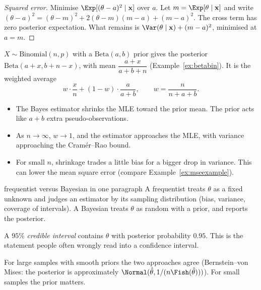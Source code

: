\begin{proof}[Squared error]
Minimise $\Exp[(\theta-a)^2\mid\mathbf{x}]$ over $a$. Let $m=\Exp[\theta\mid\mathbf{x}]$ and write $(\theta-a)^2=(\theta-m)^2+2(\theta-m)(m-a)+(m-a)^2$. The cross term has zero posterior expectation. What remains is $\Var(\theta\mid\mathbf{x})+(m-a)^2$, minimised at $a=m$.
\end{proof}

\begin{example}
$X\sim\mathrm{Binomial}(n,p)$ with a $\mathrm{Beta}(a,b)$ prior gives the posterior $\mathrm{Beta}(a+x,b+n-x)$, with mean $\dfrac{a+x}{a+b+n}$ (Example~\ref{ex:betabin}). It is the weighted average
\[ w\cdot\frac xn+(1-w)\cdot\frac a{a+b},\qquad w=\frac n{n+a+b}. \]
\begin{itemize}
  \item The Bayes estimator shrinks the MLE toward the prior mean. The prior acts like $a+b$ extra pseudo-observations.
  \item As $n\to\infty$, $w\to1$, and the estimator approaches the MLE, with variance approaching the Cram\'er--Rao bound.
  \item For small $n$, shrinkage trades a little bias for a bigger drop in variance. This can lower the mean square error (compare Example~\ref{ex:mseexample}).
\end{itemize}
\end{example}

\begin{interview}{frequentist versus Bayesian in one paragraph}
A frequentist treats $\theta$ as a fixed unknown and judges an estimator by its sampling distribution (bias, variance, coverage of intervals). A Bayesian treats $\theta$ as random with a prior, and reports the posterior.

A $95\%$ \emph{credible interval} contains $\theta$ with posterior probability $0.95$. This is the statement people often wrongly read into a confidence interval.

For large samples with smooth priors the two approaches agree (Bernstein--von Mises: the posterior is approximately $\Normal(\hat\theta,1/(n\Fish(\hat\theta)))$). For small samples the prior matters.
\end{interview}

